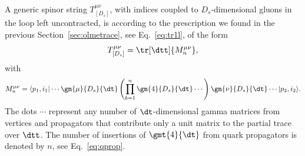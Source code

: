 A generic spinor string
$T^{\mu\nu}_{[D_s]}$, with indices coupled to $D_s$-dimensional
gluons in the loop left uncontracted, is according to the prescription
we found in the previous Section~\ref{sec:olmetrace}, see Eq.~\eqref{eq:tr1l}, of the form
\begin{equation}\label{eq:protochain}
  T^{\mu\nu}_{[D_s]} = \tr[\dtt]{M^{\mu\nu}_n},
\end{equation}
with 
\begin{equation}
  M^{\mu\nu}_n =  \langle p_1, i_1 |\cdots \gm{\mu}{D_s}{\dt} \left( \prod_{k=1}^{n}\gm{4}{D_s}{\dt} \cdots \right) \gm{\nu}{D_s}{\dt}\cdots | p_2, i_2 \rangle.
\end{equation}
The dots $\cdots$ represent any number of $\dt$-dimensional
gamma matrices from vertices and propagators that contribute only a unit matrix to the partial trace over $\dtt$. The number of insertions
of $\gmt{4}{\dt}$ from quark
propagators is denoted by $n$, see Eq.~\eqref{eq:qprop}.

